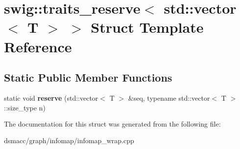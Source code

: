 \hypertarget{structswig_1_1traits__reserve_3_01std_1_1vector_3_01T_01_4_01_4}{}\section{swig\+:\+:traits\+\_\+reserve$<$ std\+:\+:vector$<$ T $>$ $>$ Struct Template Reference}
\label{structswig_1_1traits__reserve_3_01std_1_1vector_3_01T_01_4_01_4}
\subsection*{Static Public Member Functions}
\begin{DoxyCompactItemize}
\item 
\mbox{\label{structswig_1_1traits__reserve_3_01std_1_1vector_3_01T_01_4_01_4_af8b357b11221e26f64e1cd26f8e854d6}} 
static void {\bfseries reserve} (std\+::vector$<$ T $>$ \&seq, typename std\+::vector$<$ T $>$\+::size\+\_\+type n)
\end{DoxyCompactItemize}


The documentation for this struct was generated from the following file\+:\begin{DoxyCompactItemize}
\item 
dsmacc/graph/infomap/infomap\+\_\+wrap.\+cpp\end{DoxyCompactItemize}
